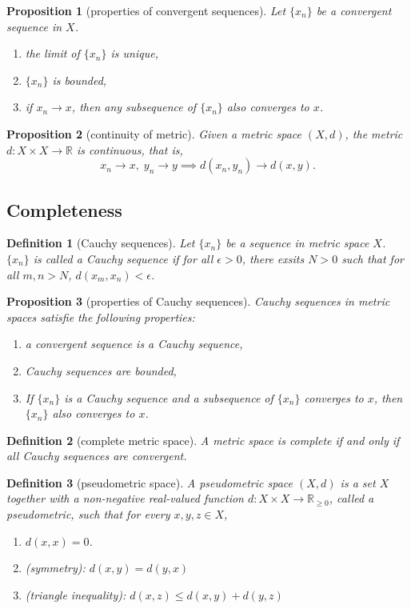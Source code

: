 \documentclass{report}
\newtheorem{definition}{Definition}[section]
\newtheorem{proposition}{Proposition}[section]
\theoremstyle{nonumberplain}
\begin{document}
\begin{proposition}[properties of convergent sequences]
	Let $\{x_n\}$ be a convergent sequence in $X$.
	\begin{enumerate}
		\item the limit of $\{x_n\}$ is unique,
		\item $\{x_n\}$ is bounded,
		\item if $x_n\to x$, then any subsequence of $\{x_n\}$ also converges to $x$.
	\end{enumerate}	
\end{proposition}

\begin{proposition}[continuity of metric]
	Given a metric space $(X,d)$, the metric $d:X\times X\to \mathbb{R}$ is continuous, that is,
	\[
		x_n\to x,\; y_n\to y\implies d(x_n,y_n)\to d(x,y).
	\]
\end{proposition}
\subsection{Completeness}
\begin{definition}[Cauchy sequences]
	Let $\{x_n\}$ be a sequence in metric space $X$. $\{x_n\}$ is called a \emph{Cauchy sequence} if for all $\epsilon>0$, there exsits $N>0$ such that for all $m,n>N$, $d(x_m,x_n)<\epsilon$.
\end{definition}

\begin{proposition}[properties of Cauchy sequences]
	Cauchy sequences in metric spaces satisfie the following properties:
	\begin{enumerate}
		\item a convergent sequence is a Cauchy sequence,
		\item Cauchy sequences are bounded,
		\item If $\{x_n\}$ is a Cauchy sequence and a subsequence of $\{x_n\}$ converges to $x$, then $\{x_n\}$ also converges to $x$.
	\end{enumerate}	
\end{proposition}

\begin{definition}[complete metric space]
	A metric space is \emph{complete} if and only if all Cauchy sequences are convergent.
\end{definition}

\begin{definition}[pseudometric space]
	A \emph{pseudometric space} $(X, d)$ is a set $X$ together with a non-negative real-valued function $d: X \times X \longrightarrow \mathbb{R}_{\geq 0}$, called a pseudometric, such that for every $x, y, z \in X$,
	\begin{enumerate}
		\item $d(x, x)=0$.
		\item (symmetry): $d(x, y)=d(y, x)$
		\item (triangle inequality): $d(x, z) \leq d(x, y)+d(y, z)$
	\end{enumerate}
\end{definition}
\end{document}
